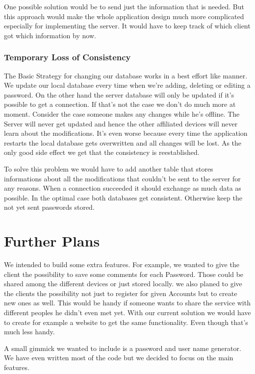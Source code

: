 \documentclass{report}
\begin{document}
One possible solution would be to send just the information that is needed. But this approach would make the whole application design much more complicated especially for implementing the server. It would have to keep track of which client got which information by now.

\subsubsection{Temporary Loss of Consistency}
The Basic Strategy for changing our database works in a best effort like manner. We update our local database every time when we're adding, deleting or editing a password. On the other hand the server database will only be updated if it's possible to get a connection. If that's not the case we don't do much more at moment.
Consider the case someone makes any changes while he's offline. The Server will never get updated and hence the other affiliated devices will never learn about the modifications. It's even worse because every time the application restarts the local database gets overwritten and all changes will be lost. As the only good side effect we get that the consistency is reestablished.

To solve this problem we would have to add another table that stores informations about all the modifications that couldn't be sent to the server for any reasons. When a connection succeeded it should exchange as much data as possible. In the optimal case both databases get consistent. Otherwise keep the not yet sent passwords stored. 

\section{Further Plans}
We intended to build some extra features. For example, we wanted to give the client the possibility to save some comments for each Password. Those could be shared among the different devices or just stored locally. 
we also planed to give the clients the possibility not just to register for given Accounts but to create new ones as well. This would be handy if someone wants to share the service with different peoples he didn't even met yet. With our current solution we would have to create for example a website to get the same functionality.
Even though that's much less handy.

A small gimmick we wanted to include is a password and user name  generator. We have even written most of the code but we decided to focus on the main features. 
\end{document}
